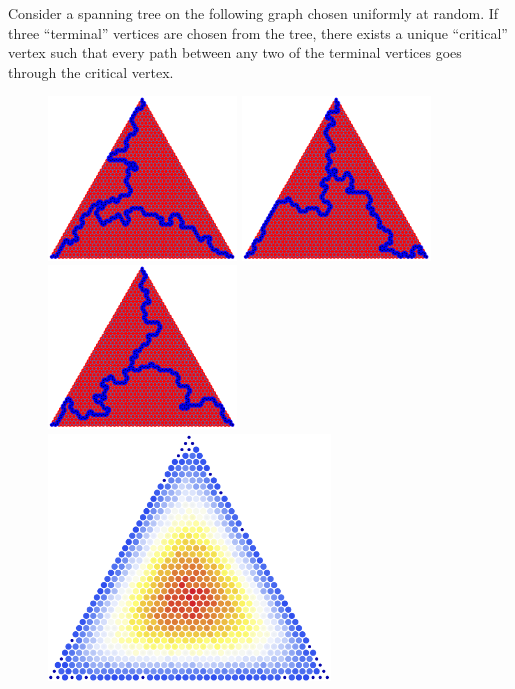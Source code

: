\documentclass{article}
\begin{document}
Consider a spanning tree on the following graph chosen uniformly at random. If
three ``terminal'' vertices are chosen from the tree, there exists a unique ``critical'' vertex
such that every path between any two of the terminal vertices goes through the critical vertex.
\begin{figure}[ht!]
  \centering
  \includegraphics[width=5cm]{assets/126_problem/n_50_1.pdf}
  \includegraphics[width=5cm]{assets/126_problem/n_50_4.pdf}
  \includegraphics[width=5cm]{assets/126_problem/n_50_6.pdf}
  \includegraphics[width=7.5cm]{assets/126_problem/HeatMap.png}

\end{figure}
\end{document}
